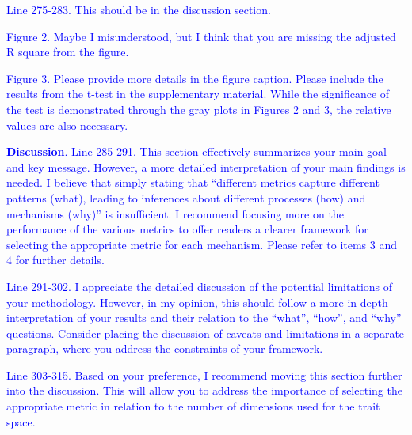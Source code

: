 \documentclass[
]{article}
\begin{document}
\textcolor{blue}{Line 275-283. This should be in the discussion section.}

\textcolor{blue}{Figure 2. Maybe I misunderstood, but I think that you are missing the adjusted R square from the figure.}


\textcolor{blue}{Figure 3. Please provide more details in the figure caption. Please include the results from the t-test in the supplementary material.
While the significance of the test is demonstrated through the gray plots in Figures 2 and 3, the relative values are also necessary.}

\textcolor{blue}{\textbf{Discussion}.}
\textcolor{blue}{Line 285-291. This section effectively summarizes your main goal and key message.
However, a more detailed interpretation of your main findings is needed.
I believe that simply stating that ``different metrics capture different patterns (what), leading to inferences about different processes (how) and mechanisms (why)'' is insufficient.
I recommend focusing more on the performance of the various metrics to offer readers a clearer framework for selecting the appropriate metric for each mechanism.
Please refer to items 3 and 4 for further details.}

\textcolor{blue}{Line 291-302.
I appreciate the detailed discussion of the potential limitations of your methodology.
However, in my opinion, this should follow a more in-depth interpretation of your results and their relation to the ``what'', ``how'', and ``why'' questions.
Consider placing the discussion of caveats and limitations in a separate paragraph, where you address the constraints of your framework.}

\textcolor{blue}{Line 303-315.
Based on your preference, I recommend moving this section further into the discussion.
This will allow you to address the importance of selecting the appropriate metric in relation to the number of dimensions used for the trait space.}
\end{document}
